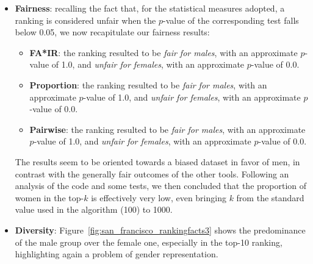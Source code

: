 \begin{itemize}
\item \textbf{Fairness}: recalling the fact that, for the statistical measures adopted, a ranking is considered unfair when the \(p\)-value of the corresponding test falls below 0.05, we now recapitulate our fairness results:
\begin{itemize}
\item \textbf{FA*IR}: the ranking resulted to be \textit{fair for males}, with an approximate \(p\)-value of 1.0, and \textit{unfair for females}, with an approximate \(p\)-value of 0.0.
\item \textbf{Proportion}: the ranking resulted to be \textit{fair for males}, with an approximate \(p\)-value of 1.0, and \textit{unfair for females}, with an approximate \(p\)-value of 0.0.
\item \textbf{Pairwise}: the ranking resulted to be \textit{fair for males}, with an approximate \(p\)-value of 1.0, and \textit{unfair for females}, with an approximate \(p\)-value of 0.0.
\end{itemize}
The results seem to be oriented towards a biased dataset in favor of men, in contrast with the generally fair outcomes of the other tools. Following an analysis of the code and some tests, we then concluded that the proportion of women in the top-\(k\) is effectively very low, even bringing \(k\) from the standard value used in the algorithm (100) to 1000.
\item \textbf{Diversity}: Figure~\ref{fig:san_francisco_rankingfacts3} shows the predominance of the male group over the female one, especially in the top-10 ranking, highlighting again a problem of gender representation.


\end{itemize}
